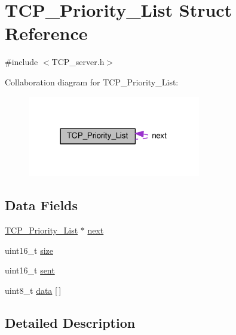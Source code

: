 \hypertarget{struct_t_c_p___priority___list}{\section{T\+C\+P\+\_\+\+Priority\+\_\+\+List Struct Reference}
\label{struct_t_c_p___priority___list}
}


{\ttfamily \#include $<$T\+C\+P\+\_\+server.\+h$>$}



Collaboration diagram for T\+C\+P\+\_\+\+Priority\+\_\+\+List\+:
\nopagebreak
\begin{figure}[H]
\begin{center}
\leavevmode
\includegraphics[width=214pt]{d0/df4/struct_t_c_p___priority___list__coll__graph}
\end{center}
\end{figure}
\subsection*{Data Fields}
\begin{DoxyCompactItemize}
\item 
\hyperlink{struct_t_c_p___priority___list}{T\+C\+P\+\_\+\+Priority\+\_\+\+List} $\ast$ \hyperlink{struct_t_c_p___priority___list_ac4565314423a94bcf735245b8b9b4c53}{next}
\item 
uint16\+\_\+t \hyperlink{struct_t_c_p___priority___list_aaba88b24a21a6c70c895c0d55f4a69a0}{size}
\item 
uint16\+\_\+t \hyperlink{struct_t_c_p___priority___list_a61e6f322b3c26ac891710463676b5185}{sent}
\item 
uint8\+\_\+t \hyperlink{struct_t_c_p___priority___list_a5c239a1bb87b52b0f1d6d68c4749cd2a}{data} \mbox{[}$\,$\mbox{]}
\end{DoxyCompactItemize}


\subsection{Detailed Description}


